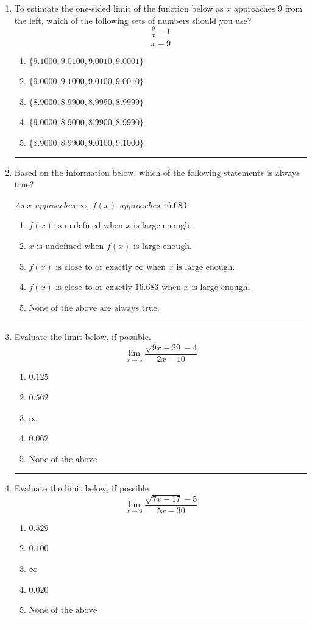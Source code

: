 \documentclass[14pt]{extbook}
\newcommand{\litem}[1]{\item#1\hspace*{-1cm}\rule{\textwidth}{0.4pt}}
\begin{document}
\begin{enumerate}
{\begin{enumerate}[label=\Alph*.]
\end{enumerate} }
\litem{
To estimate the one-sided limit of the function below as $x$ approaches 9 from the left, which of the following sets of numbers should you use?\[ \frac{\frac{9}{x} - 1}{x - 9} \]\begin{enumerate}[label=\Alph*.]
\item \( \{ 9.1000, 9.0100, 9.0010, 9.0001 \} \)
\item \( \{ 9.0000, 9.1000, 9.0100, 9.0010 \} \)
\item \( \{ 8.9000, 8.9900, 8.9990, 8.9999 \} \)
\item \( \{ 9.0000, 8.9000, 8.9900, 8.9990 \} \)
\item \( \{ 8.9000, 8.9900, 9.0100, 9.1000 \} \)

\end{enumerate} }
\litem{
Based on the information below, which of the following statements is always true?
\begin{center}
    \textit{ As $x$ approaches $\infty$, $f(x)$ approaches $16.683$. }
\end{center}
\begin{enumerate}[label=\Alph*.]
\item \( f(x) \text{ is undefined when } x \text{ is large enough}. \)
\item \( x \text{ is undefined when } f(x) \text{ is large enough}. \)
\item \( f(x) \text{ is close to or exactly } \infty \text{ when } x \text{ is large enough}. \)
\item \( f(x) \text{ is close to or exactly } 16.683 \text{ when } x \text{ is large enough}. \)
\item \( \text{None of the above are always true.} \)

\end{enumerate} }
\litem{
Evaluate the limit below, if possible.\[ \lim_{x \rightarrow 5} \frac{\sqrt{9x - 29} - 4}{2x - 10} \]\begin{enumerate}[label=\Alph*.]
\item \( 0.125 \)
\item \( 0.562 \)
\item \( \infty \)
\item \( 0.062 \)
\item \( \text{None of the above} \)

\end{enumerate} }
\litem{
Evaluate the limit below, if possible.\[ \lim_{x \rightarrow 6} \frac{\sqrt{7x - 17} - 5}{5x - 30} \]\begin{enumerate}[label=\Alph*.]
\item \( 0.529 \)
\item \( 0.100 \)
\item \( \infty \)
\item \( 0.020 \)
\item \( \text{None of the above} \)

\end{enumerate} }
\end{enumerate}
\end{document}
